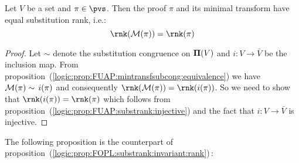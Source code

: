 \begin{prop}\label{logic:prop:FUAP:substrank:minrank}
Let $V$ be a set and $\pi\in\pvs$. Then the proof $\pi$ and its
minimal transform have equal substitution rank, i.e.:
    \[
    \rnk({\cal M}(\pi))=\rnk(\pi)
    \]
\end{prop}
\begin{proof}
Let $\sim$ denote the substitution congruence on ${\bf\Pi}(V)$ and
$i:V\to\bar{V}$ be the inclusion map. From
proposition~(\ref{logic:prop:FUAP:mintransfsubcong:equivalence}) we
have ${\cal M}(\pi)\sim\, i(\pi)$ and consequently $\rnk({\cal
M}(\pi))=\rnk(i(\pi))$. So we need to show that
$\rnk(i(\pi))=\rnk(\pi)$ which follows from
proposition~(\ref{logic:prop:FUAP:substrank:injective}) and the fact
that $i:V\to\bar{V}$ is injective.
\end{proof}

The following proposition is the counterpart of
proposition~(\ref{logic:prop:FOPL:substrank:invariant:rank})\,:

